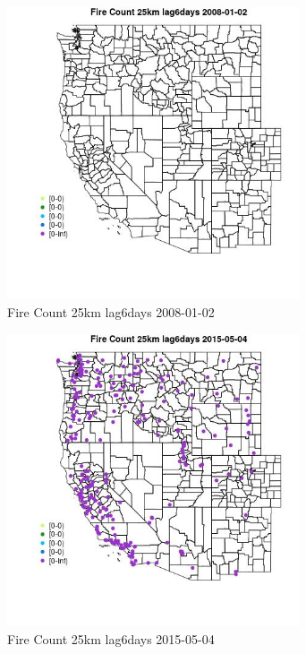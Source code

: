 \begin{figure} 
\centering  
\includegraphics[width=0.77\textwidth]{Code_Outputs/Report_ML_input_PM25_Step4_part_e_de_duplicated_aves_compiled_2019-05-18wNAs_MapObsFire_Count_25km_lag6days2008-01-02.jpg} 
\caption{\label{fig:Report_ML_input_PM25_Step4_part_e_de_duplicated_aves_compiled_2019-05-18wNAsMapObsFire_Count_25km_lag6days2008-01-02}Fire Count 25km lag6days 2008-01-02} 
\end{figure} 
 

\begin{figure} 
\centering  
\includegraphics[width=0.77\textwidth]{Code_Outputs/Report_ML_input_PM25_Step4_part_e_de_duplicated_aves_compiled_2019-05-18wNAs_MapObsFire_Count_25km_lag6days2015-05-04.jpg} 
\caption{\label{fig:Report_ML_input_PM25_Step4_part_e_de_duplicated_aves_compiled_2019-05-18wNAsMapObsFire_Count_25km_lag6days2015-05-04}Fire Count 25km lag6days 2015-05-04} 
\end{figure} 
 

